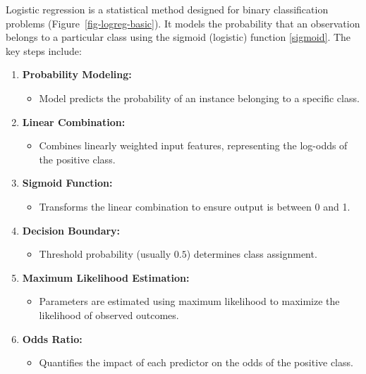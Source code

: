 \documentclass[
  a4paper,
]{scrbook}
\providecommand{\tightlist}{%
  \setlength{\itemsep}{0pt}\setlength{\parskip}{0pt}}\usepackage{longtable,booktabs,array}
\begin{document}
Logistic regression is a statistical method designed for binary
classification problems (Figure~\ref{fig-logreg-basic}). It models the
probability that an observation belongs to a particular class using the
sigmoid (logistic) function \eqref{sigmoid}. The key steps include:

\begin{enumerate}
\def\labelenumi{\arabic{enumi}.}
\tightlist
\item
  \textbf{Probability Modeling:}

  \begin{itemize}
  \tightlist
  \item
    Model predicts the probability of an instance belonging to a
    specific class.
  \end{itemize}
\item
  \textbf{Linear Combination:}

  \begin{itemize}
  \tightlist
  \item
    Combines linearly weighted input features, representing the log-odds
    of the positive class.
  \end{itemize}
\item
  \textbf{Sigmoid Function:}

  \begin{itemize}
  \tightlist
  \item
    Transforms the linear combination to ensure output is between 0 and
    1.
  \end{itemize}
\item
  \textbf{Decision Boundary:}

  \begin{itemize}
  \tightlist
  \item
    Threshold probability (usually \(0.5\)) determines class assignment.
  \end{itemize}
\item
  \textbf{Maximum Likelihood Estimation:}

  \begin{itemize}
  \tightlist
  \item
    Parameters are estimated using maximum likelihood to maximize the
    likelihood of observed outcomes.
  \end{itemize}
\item
  \textbf{Odds Ratio:}

  \begin{itemize}
  \tightlist
  \item
    Quantifies the impact of each predictor on the odds of the positive
    class.
  \end{itemize}
\end{enumerate}
\end{document}

